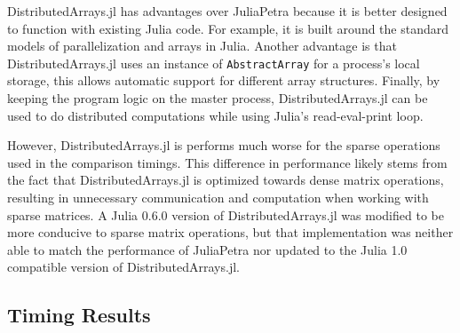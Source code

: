 \documentclass[acmsmall]{acmart}
\newcommand{\snippet}[1]{\lstinline{#1}}
\begin{document}
	DistributedArrays.jl has advantages over JuliaPetra because it is better designed to function with
	existing Julia code.
	For example, it is built around the standard models of parallelization and arrays in Julia.
	Another advantage is that DistributedArrays.jl uses an instance of \snippet{AbstractArray}
	for a process's local storage, this allows automatic support for different array structures.
	Finally, by keeping the program logic on the master process, DistributedArrays.jl can be used to
	do distributed computations while using Julia's read-eval-print loop.
	
	However, DistributedArrays.jl is performs much worse for the sparse operations used in the comparison timings.
	This difference in performance likely stems from the fact that DistributedArrays.jl is optimized towards dense matrix operations, resulting in unnecessary communication and computation when working with sparse matrices.
	A Julia 0.6.0 version of DistributedArrays.jl was modified to be more conducive to sparse matrix operations, but that implementation was neither able to match the performance of JuliaPetra nor updated to the Julia 1.0 compatible version of DistributedArrays.jl.
	
	\subsection{Timing Results}
	
\end{document}

